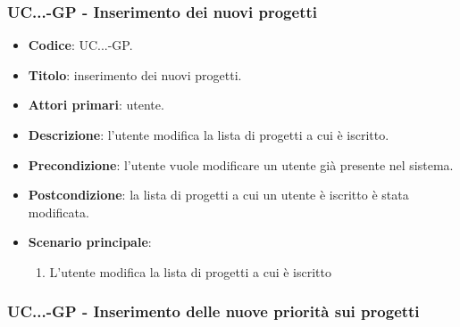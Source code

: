             \subsubsection{UC\theuccount.\thesubuccount.\thesubsubuccount.\thesubsubsubuccount-GP - Inserimento dei nuovi progetti}
            
            \begin{itemize}
                \item \textbf{Codice}: UC\theuccount.\thesubuccount.\thesubsubuccount.\thesubsubsubuccount-GP.
                \item \textbf{Titolo}: inserimento dei nuovi progetti.
                \item \textbf{Attori primari}: utente.
                \item \textbf{Descrizione}: l'utente modifica la lista di progetti a cui è iscritto.
                \item \textbf{Precondizione}: l'utente vuole modificare un utente già presente nel sistema.
                \item \textbf{Postcondizione}: la lista di progetti a cui un utente è iscritto è stata modificata.
                \item \textbf{Scenario principale}:
                \begin{enumerate}
                    \item L'utente modifica la lista di progetti a cui è iscritto
                \end{enumerate}
            \end{itemize}
        
            \subsubsection{UC\theuccount.\thesubuccount.\thesubsubuccount.\thesubsubsubuccount-GP - Inserimento delle nuove priorità sui progetti}
            
